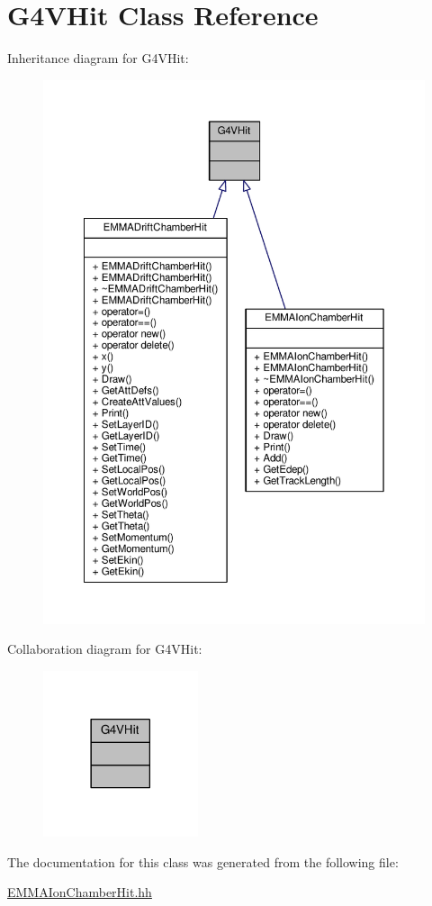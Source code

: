 \hypertarget{classG4VHit}{}\section{G4\+V\+Hit Class Reference}
\label{classG4VHit}


Inheritance diagram for G4\+V\+Hit\+:
\nopagebreak
\begin{figure}[H]
\begin{center}
\leavevmode
\includegraphics[width=350pt]{classG4VHit__inherit__graph}
\end{center}
\end{figure}


Collaboration diagram for G4\+V\+Hit\+:
\nopagebreak
\begin{figure}[H]
\begin{center}
\leavevmode
\includegraphics[width=129pt]{classG4VHit__coll__graph}
\end{center}
\end{figure}


The documentation for this class was generated from the following file\+:\begin{DoxyCompactItemize}
\item 
\hyperlink{EMMAIonChamberHit_8hh}{E\+M\+M\+A\+Ion\+Chamber\+Hit.\+hh}\end{DoxyCompactItemize}
